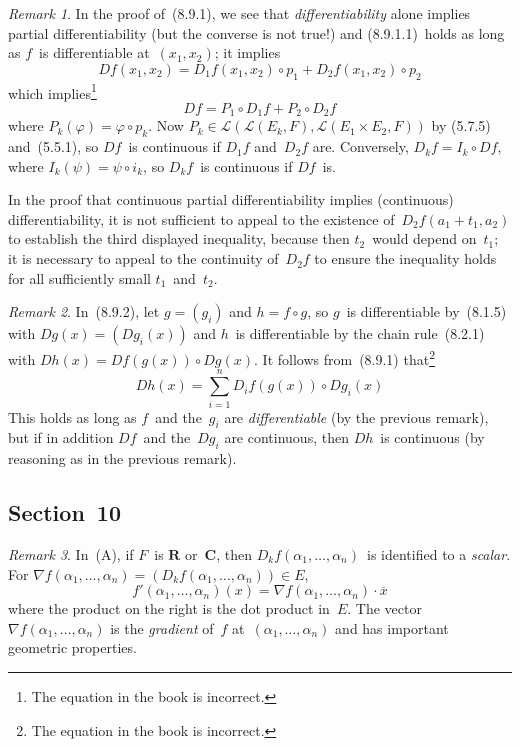 \documentclass[letterpaper,12pt]{article}
\newcommand{\R}{\mathbf{R}}
\newcommand{\C}{\mathbf{C}}
\renewcommand{\L}{\mathcal{L}}
\newcommand{\after}{\circ}
\newcommand{\grad}{\nabla}
\newcommand{\conj}[1]{\overline{#1}}
\theoremstyle{plain}
\theoremstyle{definition}
\theoremstyle{remark}
\newtheorem*{rmk}{Remark}
\begin{document}
\begin{rmk}
In the proof of~(8.9.1), we see that \emph{differentiability} alone implies partial differentiability (but the converse is not true!) and (8.9.1.1)~holds as long as \(f\)~is differentiable at~\((x_1,x_2)\); it implies
\[Df(x_1,x_2)=D_1f(x_1,x_2)\after p_1+D_2f(x_1,x_2)\after p_2\]
which implies\footnote{The equation in the book is incorrect.}
\[Df=P_1\after D_1f+P_2\after D_2f\]
where \(P_k(\varphi)=\varphi\after p_k\). Now \(P_k\in\L(\L(E_k,F),\L(E_1\times E_2,F))\) by (5.7.5) and~(5.5.1), so \(Df\)~is continuous if \(D_1f\) and~\(D_2f\) are. Conversely, \(D_kf=I_k\after Df\), where \(I_k(\psi)=\psi\after i_k\), so \(D_kf\)~is continuous if \(Df\)~is.

In the proof that continuous partial differentiability implies (continuous) differentiability, it is not sufficient to appeal to the existence of~\(D_2f(a_1+t_1,a_2)\) to establish the third displayed inequality, because then \(t_2\)~would depend on~\(t_1\); it is necessary to appeal to the continuity of~\(D_2f\) to ensure the inequality holds for all sufficiently small \(t_1\)~and~\(t_2\).
\end{rmk}

\begin{rmk}
In~(8.9.2), let \(g=(g_i)\) and \(h=f\after g\), so \(g\)~is differentiable by~(8.1.5) with \(Dg(x)=(Dg_i(x))\) and \(h\)~is differentiable by the chain rule~(8.2.1) with \(Dh(x)=Df(g(x))\after Dg(x)\). It follows from~(8.9.1) that\footnote{The equation in the book is incorrect.}
\[Dh(x)=\sum_{i=1}^nD_if(g(x))\after Dg_i(x)\]
This holds as long as \(f\)~and the~\(g_i\) are \emph{differentiable} (by the previous remark), but if in addition \(Df\)~and the~\(Dg_i\) are continuous, then \(Dh\)~is continuous (by reasoning as in the previous remark).
\end{rmk}

\subsection*{Section~10}
\begin{rmk}
In~(A), if \(F\)~is \(\R\) or~\(\C\), then \(D_kf(\alpha_1,\ldots,\alpha_n)\)~is identified to a \emph{scalar}. For \(\grad f(\alpha_1,\ldots,\alpha_n)=(D_kf(\alpha_1,\ldots,\alpha_n))\in E\),
\[f'(\alpha_1,\ldots,\alpha_n)(x)=\grad f(\alpha_1,\ldots,\alpha_n)\cdot\conj{x}\]
where the product on the right is the dot product in~\(E\). The vector \(\grad f(\alpha_1,\ldots,\alpha_n)\) is the \emph{gradient} of~\(f\) at~\((\alpha_1,\ldots,\alpha_n)\) and has important geometric properties.
\end{rmk}
\end{document}
